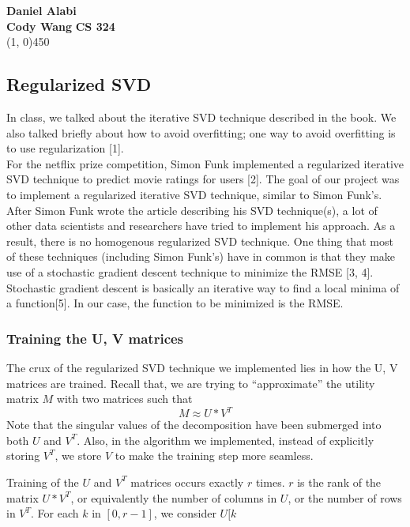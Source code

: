 \documentclass[12pt]{article}
\begin{document}
\noindent \textbf{Daniel Alabi} \\
\textbf{Cody Wang}
\hfill
\textbf{CS 324}\\
\line(1, 0){450} 

\subsection*{Regularized SVD}

In class, we talked about the iterative SVD technique described in the book.
We also talked briefly about how to avoid overfitting; one way to avoid
overfitting is to use regularization [1]. \\

\noindent For the netflix prize competition, Simon Funk implemented a regularized 
iterative SVD technique to predict movie ratings for users [2]. The goal of our
project was to implement a regularized iterative SVD technique, similar
to Simon Funk's. After Simon Funk wrote the article describing his
SVD technique(s), a lot of other data scientists and researchers
have tried to implement his approach. As a result, there is no homogenous
regularized SVD technique. One thing that most of these techniques (including
Simon Funk's) have in common is that they make use of a stochastic 
gradient descent technique to minimize the RMSE [3, 4]. Stochastic gradient 
descent is basically an iterative way to find a local minima of a 
function[5]. In our case, the function to be minimized is the RMSE.

\subsubsection*{Training the U, V matrices}

The crux of the regularized SVD technique we implemented lies in how
the U, V matrices are trained. Recall that, we are trying to ``approximate''
the utility matrix $M$ with two matrices such that
\begin{equation*}
  M \approx U * V^T
\end{equation*}
Note that the singular values of the decomposition have been submerged into
both $U$ and $V^T$. Also, in the algorithm we implemented, instead of 
explicitly storing $V^T$, we store $V$ to make the training step more
seamless.

Training of the $U$ and $V^T$ matrices occurs exactly $r$ times. $r$ is the
rank of the matrix $U*V^T$, or equivalently the number of columns in
$U$, or the number of rows in $V^T$. For each $k$ in $[0, r-1]$, we
consider $U[k$
\end{document}
